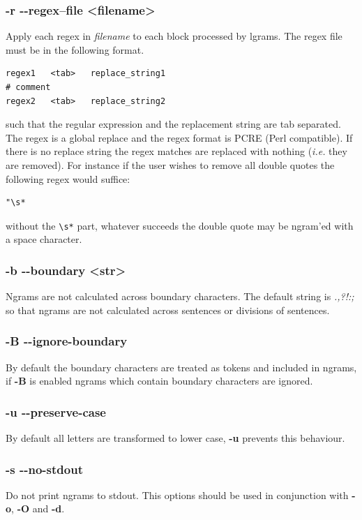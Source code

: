 \documentclass[12pt,a4paper]{report}
\newcommand{\optarg}[1]{\textless#1\textgreater}
\begin{document}
\subsubsection{-r -{}-regex--file \optarg{filename}}
Apply each regex in \emph{filename} to each block processed by lgrams. The regex file must be in the following format.
\begin{verbatim}
regex1   <tab>   replace_string1
# comment
regex2   <tab>   replace_string2
\end{verbatim}
such that the regular expression and the replacement string are tab separated. The regex is a global replace and the regex format is PCRE (Perl compatible). If there is no replace string the regex matches are replaced with nothing (\emph{i.e.} they are removed). For instance if the user wishes to remove all double quotes the following regex would suffice:
\begin{verbatim}
"\s*
\end{verbatim}
without the \texttt{\textbackslash s*} part, whatever succeeds the double quote may be ngram'ed with a space character.

\subsubsection{-b -{}-boundary \optarg{str}}
Ngrams are not calculated across boundary characters. The default string is \emph{.,?!:;} so that ngrams are not calculated across sentences or divisions of sentences.

\subsubsection{-B -{}-ignore-boundary}
By default the boundary characters are treated as tokens and included in ngrams, if \textbf{-B} is enabled ngrams which contain boundary characters are ignored.

\subsubsection{-u -{}-preserve-case}
By default all letters are transformed to lower case, \textbf{-u} prevents this behaviour.

\subsubsection{-s -{}-no-stdout}
Do not print ngrams to stdout. This options should be used in conjunction with \textbf{-o}, \textbf{-O} and \textbf{-d}.
\end{document}
